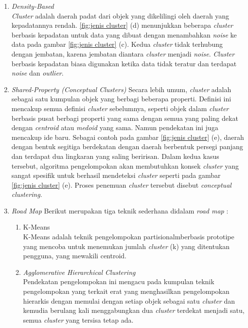 \begin{enumerate}
    \item \textit{Density-Based} \\
        \textit{Cluster} adalah daerah padat dari objek yang dikelilingi oleh daerah yang kepadatannya rendah. \ref{fig:jenis cluster} (d) menunjukkan beberapa \textit{cluster} berbasis kepadatan untuk data yang dibuat dengan menambahkan \textit{noise} ke data pada gambar \ref{fig:jenis cluster} (c). Kedua \textit{cluster} tidak terhubung dengan jembatan, karena jembatan diantara \textit{cluster} menjadi \textit{noise}. \textit{Cluster} berbasis kepadatan biasa digunakan ketika data tidak teratur dan terdapat \textit{noise} dan \textit{outlier}. 
        
    \item \textit{Shared-Property (Conceptual Clusters)}
        Secara lebih umum, \textit{cluster} adalah sebagai satu kumpulan objek yang berbagi beberapa properti. Definisi ini mencakup semua definisi \textit{cluster} sebelumnya, seperti objek dalam \textit{cluster} berbasis pusat berbagi properti yang sama dengan semua yang paling dekat dengan \textit{centroid} atau \textit{medoid} yang sama. Namun pendekatan ini juga mencakup ide baru. Sebagai contoh pada gambar \ref{fig:jenis cluster} (e), daerah dengan bentuk segitiga berdekatan dengan daerah berbentuk persegi panjang dan terdapat dua lingkaran yang saling beririsan. Dalam kedua kasus tersebut, algoritma pengelompokan akan membutuhkan konsek \textit{cluster} yang sangat spesifik untuk berhasil mendeteksi \textit{cluster} seperti pada gambar \ref{fig:jenis cluster} (e). Proses penemuan \textit{cluster} tersebut disebut \textit{conceptual clustering}.
        
    \item \textit{Road Map}
        Berikut merupakan tiga teknik sederhana didalam \textit{road map} :
        
        \begin{enumerate}
            \item K-Means\\
                K-Means adalah teknik pengelompokan partisionalmberbasis prototipe yang mencoba untuk menemukan jumlah \textit{cluster} (k) yang ditentukan pengguna, yang mewakili centroid.
            
            \item \textit{Agglomerative Hierarchical Clustering}\\
                Pendekatan pengelompokan ini mengacu pada kumpulan teknik pengelompokan yang terkait erat yang menghasilkan pengelompokan hierarkis dengan memulai dengan setiap objek sebagai satu \textit{cluster} dan kemudia berulang kali menggabungkan dua \textit{cluster} terdekat menjadi satu, semua \textit{cluster}  yang tersisa tetap ada.
            

\end{enumerate}
\end{enumerate}
